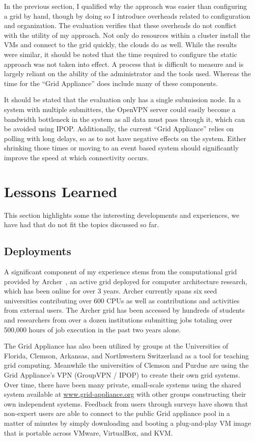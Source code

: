 In the previous section, I qualified why the approach was easier than
configuring a grid by hand, though by doing so I introduce overheads related to
configuration and organization.  The evaluation verifies that these overheads
do not conflict with the utility of my approach.  Not only do resources within
a cluster install the VMs and connect to the grid quickly, the clouds do as
well.  While the results were similar, it should be noted that the time
required to configure the static approach was not taken into effect.  A process
that is difficult to measure and is largely reliant on the ability of the
administrator and the tools used.  Whereas the time for the ``Grid Appliance''
does include many of these components.

It should be stated that the evaluation only has a single submission node.  In
a system with multiple submitters, the OpenVPN server could easily become a
bandwidth bottleneck in the system as all data must pass through it, which can
be avoided using IPOP.  Additionally, the current ``Grid Appliance'' relies on
polling with long delays, so as to not have negative effects on the system.
Either shrinking those times or moving to an event based system should
significantly improve the speed at which connectivity occurs.  

\section{Lessons Learned}
\label{lessons_learned}

This section highlights some the interesting developments and experiences, we
have had that do not fit the topics discussed so far.  

\subsection{Deployments}

A significant component of my experience stems from the computational grid
provided by Archer~\cite{archer}, an active grid deployed for computer
architecture research, which has been online for over 3 years.  Archer
currently spans six seed universities contributing over 600 CPUs as well as
contributions and activities from external users.  The Archer grid has been
accessed by hundreds of students and researchers from over a dozen institutions
submitting jobs totaling over 500,000 hours of job execution in the past two
years alone.

The Grid Appliance has also been utilized by groups at the Universities of
Florida, Clemson, Arkansas, and Northwestern Switzerland as a tool for teaching
grid computing.  Meanwhile the universities of Clemson and Purdue are using the
Grid Appliance's VPN (GroupVPN / IPOP) to create their own grid systems.  Over
time, there have been many private, small-scale systems using the shared system
available at \url{www.grid-appliance.org} with other groups constructing their
own independent systems.  Feedback from users through surveys have shown that
non-expert users are able to connect to the public Grid appliance pool in a
matter of minutes by simply downloading and booting a plug-and-play VM image
that is portable across VMware, VirtualBox, and KVM.

